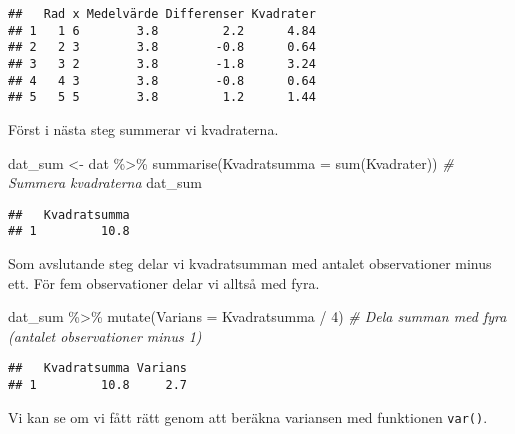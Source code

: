 \documentclass[
]{book}
\newenvironment{Shaded}{\begin{snugshade}}{\end{snugshade}}
\newcommand{\AttributeTok}[1]{\textcolor[rgb]{0.77,0.63,0.00}{#1}}
\newcommand{\CommentTok}[1]{\textcolor[rgb]{0.56,0.35,0.01}{\textit{#1}}}
\newcommand{\DecValTok}[1]{\textcolor[rgb]{0.00,0.00,0.81}{#1}}
\newcommand{\FunctionTok}[1]{\textcolor[rgb]{0.00,0.00,0.00}{#1}}
\newcommand{\NormalTok}[1]{#1}
\newcommand{\OtherTok}[1]{\textcolor[rgb]{0.56,0.35,0.01}{#1}}
\newcommand{\SpecialCharTok}[1]{\textcolor[rgb]{0.00,0.00,0.00}{#1}}
\theoremstyle{definition}
\theoremstyle{definition}
\theoremstyle{definition}
\theoremstyle{definition}
\theoremstyle{remark}
\begin{document}
\begin{verbatim}
##   Rad x Medelvärde Differenser Kvadrater
## 1   1 6        3.8         2.2      4.84
## 2   2 3        3.8        -0.8      0.64
## 3   3 2        3.8        -1.8      3.24
## 4   4 3        3.8        -0.8      0.64
## 5   5 5        3.8         1.2      1.44
\end{verbatim}

Först i nästa steg summerar vi kvadraterna.

\begin{Shaded}
\begin{Highlighting}[]
\NormalTok{dat\_sum }\OtherTok{\textless{}{-}}\NormalTok{ dat }\SpecialCharTok{\%\textgreater{}\%} 
  \FunctionTok{summarise}\NormalTok{(}\AttributeTok{Kvadratsumma =} \FunctionTok{sum}\NormalTok{(Kvadrater))       }\CommentTok{\# Summera kvadraterna}
\NormalTok{dat\_sum}
\end{Highlighting}
\end{Shaded}

\begin{verbatim}
##   Kvadratsumma
## 1         10.8
\end{verbatim}

Som avslutande steg delar vi kvadratsumman med antalet observationer minus ett. För fem observationer delar vi alltså med fyra.

\begin{Shaded}
\begin{Highlighting}[]
\NormalTok{dat\_sum }\SpecialCharTok{\%\textgreater{}\%} \FunctionTok{mutate}\NormalTok{(}\AttributeTok{Varians =}\NormalTok{ Kvadratsumma }\SpecialCharTok{/} \DecValTok{4}\NormalTok{)   }\CommentTok{\# Dela summan med fyra (antalet observationer minus 1)}
\end{Highlighting}
\end{Shaded}

\begin{verbatim}
##   Kvadratsumma Varians
## 1         10.8     2.7
\end{verbatim}

Vi kan se om vi fått rätt genom att beräkna variansen med funktionen \texttt{var()}.

\begin{Shaded}
\end{Shaded}
\end{document}
